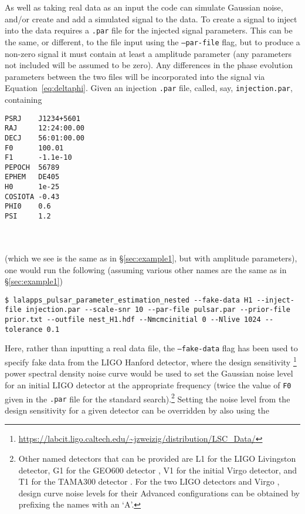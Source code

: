 As well as taking real data as an input the code can simulate Gaussian noise, and/or create and add a simulated signal to the data. To create
a signal to inject into the data requires a {\tt .par} file for the injected signal parameters. This can be the same, or different, to the file input
using the {\tt --par-file} flag, but to produce a non-zero signal it must contain at least a \gw amplitude parameter (any parameters not
included will be assumed to be zero). Any differences in the phase evolution parameters between the two files will be incorporated into the
signal via Equation~\ref{eq:deltaphi}. Given an injection {\tt .par} file, called, say, {\tt injection.par}, containing
\begin{lrbox}{\Lst}
\begin{lstlisting}
PSRJ    J1234+5601
RAJ     12:24:00.00
DECJ    56:01:00.00
F0      100.01
F1      -1.1e-10
PEPOCH  56789
EPHEM   DE405
H0      1e-25
COSIOTA -0.43
PHI0    0.6
PSI     1.2
\end{lstlisting}
\end{lrbox}
\\[5pt] \indent \fbox{\usebox{\Lst}} \\[5pt]
(which we see is the same as in \S\ref{sec:example1}, but with \gw amplitude parameters), one would run the following (assuming various other
names are the same as in \S\ref{sec:example1})
\begin{lstlisting}[frame=single]
$ lalapps_pulsar_parameter_estimation_nested --fake-data H1 --inject-file injection.par --scale-snr 10 --par-file pulsar.par --prior-file prior.txt --outfile nest_H1.hdf --Nmcmcinitial 0 --Nlive 1024 --tolerance 0.1
\end{lstlisting}
Here, rather than inputting a real data file, the {\tt --fake-data} flag has been used to specify fake data from the LIGO Hanford detector, where the
design sensitivity \citep{SRD}\footnote{\url{https://labcit.ligo.caltech.edu/~jzweizig/distribution/LSC_Data/}} power spectral density noise curve
would be used to set the Gaussian noise level for an initial LIGO detector at the appropriate \gw frequency (twice the value of {\tt F0} given in the {\tt .par}
file for the standard search).\footnote{Other
named detectors that can be provided are L1 for the LIGO Livingston detector, G1 for the GEO600 detector \citep[from Table~IV of][]{2001PhRvD..63d4023D},
V1 for the initial Virgo detector, and T1 for the TAMA300 detector \citep[from Table~IV of][]{2001PhRvD..63d4023D}. For the two LIGO detectors
\citep{aLIGOSRD} and Virgo \citep[see Equation~6 of][]{2012arXiv1202.4031M}, design curve noise levels for their Advanced configurations can be obtained
by prefixing the names with an `A'.} Setting the noise level from the design sensitivity for a given detector can be overridden by also using the
